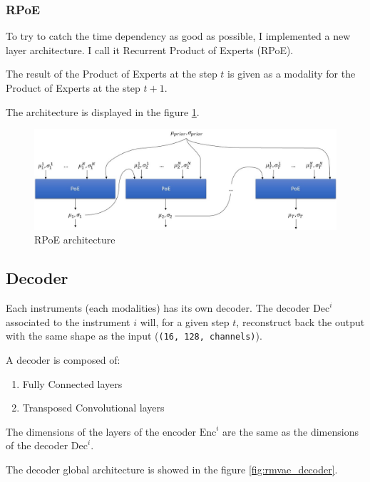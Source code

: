 \documentclass[12pt]{report}
\begin{document}
\subsubsection{RPoE}
\label{sec:rpoe}

To try to catch the time dependency as good as possible, I implemented a new layer architecture. I call it Recurrent Product of Experts (RPoE).

The result of the Product of Experts at the step $t$ is given as a modality for the Product of Experts at the step $t+1$.

The architecture is displayed in the figure \ref{fig:rpoe_architecture}.

\begin{figure}[h]
    \centering
    \includegraphics[width=\textwidth]{images/nn/architectures/rmvae/rpoe_architecture.jpg}
    \caption{RPoE architecture}
    \label{fig:rpoe_architecture}
\end{figure}


\subsection{Decoder}
\label{sec:decoder}

Each instruments (each modalities) has its own decoder.
The decoder $\text{Dec}^i$ associated to the instrument $i$ will, for a given step $t$, reconstruct back the output with the same shape as the input (\texttt{(16, 128, channels)}).

A decoder is composed of:
\begin{enumerate}
    \item Fully Connected layers
    \item Transposed Convolutional layers
\end{enumerate}
The dimensions of the layers of the encoder $\text{Enc}^i$ are the same as the dimensions of the decoder $\text{Dec}^i$.

The decoder global architecture is showed in the figure \ref{fig:rmvae_decoder}.
\end{document}
